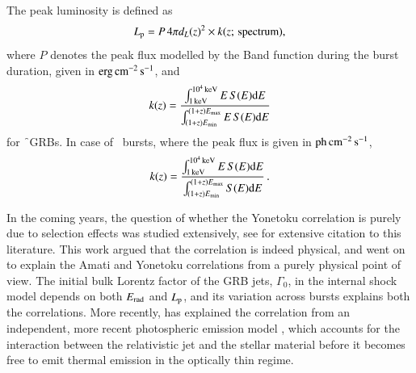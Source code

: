 The peak luminosity is defined as
\begin{equation}
L_{\rm p} = P \, 4\pi d_L(z)^{2} \times k(z; \,{\rm spectrum}),
\label{eq:Luminosity_formula}
\end{equation} where $P$ denotes the peak flux modelled by the Band function during the burst duration, given in $\rm erg \, cm^{-2} \, s^{-1}$, and
\begin{equation}
k(z) = \dfrac{\int_{1 \, \rm{keV}}^{10^4 \, \rm{keV}} E \, S(E) {\rm d} E}{\int_{(1+z)E_{\rm{min}}}^{(1+z)E_{\rm{max}}} E \, S(E) {\rm d} E}
\label{eq:definition_of_k---Fermi--long}
\end{equation} for \f\ GRBs. In case of \s\ bursts, where the peak flux is given in $\rm ph \, cm^{-2} \, s^{-1}$,
\begin{equation}
k(z) = \dfrac{\int_{1 \, \rm{keV}}^{10^4 \, \rm{keV}} E \, S(E) {\rm d} E}{\int_{(1+z)E_{\rm{min}}}^{(1+z)E_{\rm{max}}} S(E) {\rm d} E} \,.
\label{eq:definition_of_k---Swift--long}
\end{equation}

In the coming years, the question of whether the Yonetoku correlation is purely due to selection effects was studied extensively, see \cite{Ghirlanda_et_al.-2012-MNRAS} for extensive citation to this literature. This work argued that the correlation is indeed physical, and went on to explain the Amati and Yonetoku correlations from a purely physical point of view. The initial bulk Lorentz factor of the GRB jets, $\Gamma_0$, in the internal shock model \citep{Rees_&_Meszaros-1994-ApJL} depends on both $E_{\rm rad}$ and $L_{\rm p}$, and its variation across bursts explains both the correlations. More recently, \cite{Ito_et_al.-2019-NatComm} has explained the correlation from an independent, more recent photospheric emission model \citep{Lazzati_et_al.-2009-ApJ}, which accounts for the interaction between the relativistic jet and the stellar material before it becomes free to emit thermal emission in the optically thin regime.

